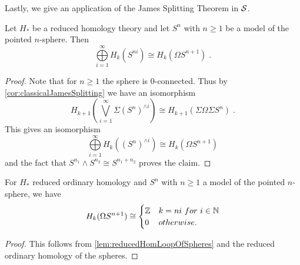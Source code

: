 Lastly, we give an application of the James Splitting Theorem in $\mathcal{S}$.
\begin{lemma}\label{lem:reducedHomLoopOfSpheres}
    Let $H_*$ be a reduced homology theory and let $S^n$ with $n\geq1$ be a model of the pointed $n$-sphere.
    Then
    \begin{equation*}
        \bigoplus\limits_{i=1}^{\infty}H_k(S^{ni})\cong H_k(\Omega S^{n+1})\;.
    \end{equation*}
    \begin{proof}
        Note that for $n\geq1$ the sphere is $0$-connected.
        Thus by \cref{cor:classicalJamesSplitting} we have an isomorphism 
        \begin{equation*}
            H_{k+1}\left(\bigvee\limits_{i=1}^{\infty}\Sigma \left(S^n\right)^{\wedge i}\right)\cong H_{k+1}\left(\Sigma\Omega\Sigma S^n\right)\;.
        \end{equation*}
        This gives an isomorphism
        \begin{equation*}
            \bigoplus\limits_{i=1}^{\infty}H_k\left(\left(S^n\right)^{\wedge i}\right)\cong H_k\left(\Omega S^{n+1}\right)
        \end{equation*}
        and the fact that $S^{n_1}\wedge S^{n_2}\cong S^{n_1+n_2}$ proves the claim.
    \end{proof}
\end{lemma}
\begin{corollary}
    For $H_*$ reduced ordinary homology and $S^n$ with $n\geq1$ a model of the pointed $n$-sphere, we have
    \begin{equation*}
        H_k(\Omega S^{n+1})\cong
        \begin{cases}
            \mathbb{Z} & k=ni ~for~ i\in\mathbb{N}\\
            0 & otherwise.
        \end{cases}
    \end{equation*}
    \begin{proof}
        This follows from \cref{lem:reducedHomLoopOfSpheres} and the reduced ordinary homology of the spheres.
    \end{proof}
\end{corollary}
